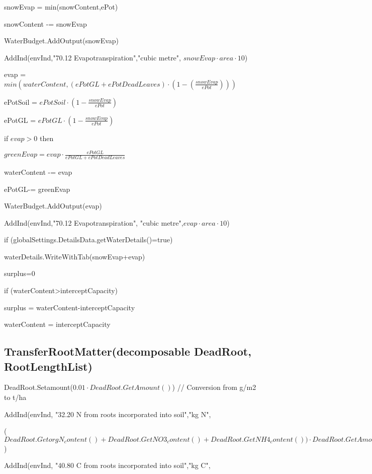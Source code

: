 \documentclass[%
]{scrartcl}
\begin{document}
{{{      snowEvap = min(snowContent,ePot)

      snowContent -= snowEvap

      WaterBudget.AddOutput(snowEvap)

      AddInd(envInd,"70.12 Evapotranspiration","cubic metre",
$snowEvap \cdot area \cdot 10$)

      evap = $min(waterContent,( ePotGL+ePotDeadLeaves)
 \cdot (1-(\tfrac{snowEvap}{ePot})))$
     
  ePotSoil =  $ePotSoil \cdot (1-\tfrac{snowEvap}{ePot})$
      
  ePotGL = $ ePotGL \cdot (1-\tfrac{snowEvap}{ePot})$

      if $evap>0$ then
     
	\quad       $greenEvap = 
evap \cdot \tfrac{ ePotGL}{ePotGL+ePotDeadLeaves}$
     
  \quad    waterContent -= evap
      
 \quad      ePotGL-=  greenEvap
      
   \quad  WaterBudget.AddOutput(evap)
      
 \quad    AddInd(envInd,"70.12 Evapotranspiration",
"cubic metre",$evap \cdot area \cdot 10$)
      
   
  
 if (globalSettings.DetailsData.getWaterDetails()=true)

  \quad	   waterDetails.WriteWithTab(snowEvap+evap)



   surplus=0

   if (waterContent>interceptCapacity)

   \quad    surplus = waterContent-interceptCapacity

  \quad    waterContent = interceptCapacity



\subsection{TransferRootMatter(decomposable  DeadRoot,  RootLengthList)}
   DeadRoot.Setamount($0.01 \cdot DeadRoot.GetAmount()$)     
    // Conversion from g/m2 to t/ha
    
   AddInd(envInd,
"32.20 N from roots incorporated into soil","kg N",

($DeadRoot.GetorgN_content()+DeadRoot.GetNO3_content()+
DeadRoot.GetNH4_content()) \cdot DeadRoot.GetAmount() \cdot area \cdot 1000$)
   
	 AddInd(envInd,
"40.80 C from roots incorporated into soil","kg C",

}}}
\end{document}
